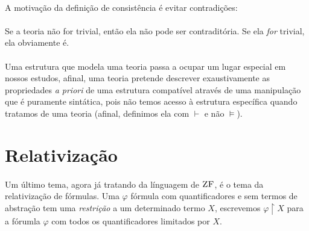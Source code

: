         \paragraph{}
            A motivação da definição de consistência é evitar contradições: 
            \begin{prooftree}



            \end{prooftree}
        \paragraph{}
            Se a teoria não for trivial, então ela não pode ser 
            contraditória. Se ela \emph{for} trivial, ela  
            obviamente é.
        \paragraph{}
            Uma estrutura que modela uma teoria passa a ocupar um 
            lugar especial em nossos estudos, afinal, uma teoria 
            pretende descrever exaustivamente as propriedades 
            \emph{a priori} de uma estrutura compatível através de 
            uma manipulação que é puramente sintática, pois não temos 
            acesso à estrutura específica quando tratamos de uma 
            teoria (afinal, definimos ela com $\vdash$ e não $\vDash$).
    \section{Relativização}
        \paragraph{}
            Um último tema, agora já tratando da línguagem de $\ZF$, é 
            o tema da relativização de fórmulas. Uma $\varphi$ fórmula 
            com quantificadores e sem termos de abstração tem uma 
            \textit{restrição} a um determinado termo $X$, escrevemos 
            $\varphi\restriction X$ para a fórumla $\varphi$ com todos 
            os quantificadores limitados por $X$.
